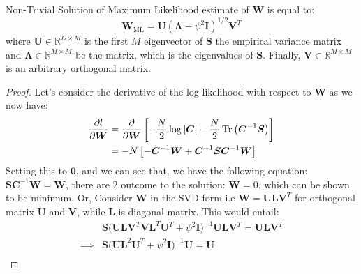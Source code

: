 \begin{proposition}
    Non-Trivial Solution of Maximum Likelihood estimate of $\boldsymbol W$ is equal to:
    \begin{equation*}
        \boldsymbol W_\text{ML} = \boldsymbol U (\boldsymbol \Lambda - \psi^2\boldsymbol I)^{1/2}\boldsymbol V^T
    \end{equation*}
    where $\boldsymbol U \in \mathbb{R}^{D\times M}$ is the first $M$ eigenvector of $\boldsymbol S$ the empirical variance matrix and $\boldsymbol \Lambda \in \mathbb{R}^{M\times M}$ be the matrix, which is the eigenvalues of $\boldsymbol S$. Finally, $\boldsymbol V \in \mathbb{R}^{M\times M}$ is an arbitrary orthogonal matrix.
\end{proposition}
\begin{proof}
    Let's consider the derivative of the log-likelihood with respect to $\boldsymbol W$ as we now have:
    \begin{equation*}
    \begin{aligned}
        \frac{\partial l}{\partial \boldsymbol W} &= \frac{\partial}{\partial \boldsymbol W}\left[ -\frac{N}{2}\log\left| \boldsymbol C \right| -\frac{N}{2}\operatorname{Tr}\left( \boldsymbol C^{-1}\boldsymbol S \right)  \right] \\
        &= -N\left[ -\boldsymbol C^{-1}\boldsymbol W + \boldsymbol C^{-1}\boldsymbol S \boldsymbol C^{-1}\boldsymbol W  \right] 
    \end{aligned}
    \end{equation*}
    Setting this to $\boldsymbol 0$, and we can see that, we have the following equation: $\boldsymbol S\boldsymbol C^{-1}\boldsymbol W=\boldsymbol W$, there are $2$ outcome to the solution: $\boldsymbol W = 0$, which can be shown to be minimum. Or,  Consider $\boldsymbol W$ in the SVD form i.e $\boldsymbol W = \boldsymbol U\boldsymbol L\boldsymbol V^T$ for orthogonal matrix $\boldsymbol U$ and $\boldsymbol V$, while $\boldsymbol L$ is diagonal matrix. This would entail:
    \begin{equation*}
    \begin{aligned}
        &\boldsymbol S\Big( \boldsymbol U \boldsymbol L\boldsymbol V^T \boldsymbol V \boldsymbol L^T\boldsymbol U^T + \psi^2\boldsymbol I \Big)^{-1}\boldsymbol U \boldsymbol L\boldsymbol V^T  = \boldsymbol U \boldsymbol L\boldsymbol V^T  \\
        \implies & \boldsymbol S\Big( \boldsymbol U \boldsymbol L^2\boldsymbol U^T + \psi^2\boldsymbol I \Big)^{-1}\boldsymbol U  = \boldsymbol U \\

\end{aligned}
\end{equation*}
\end{proof}
